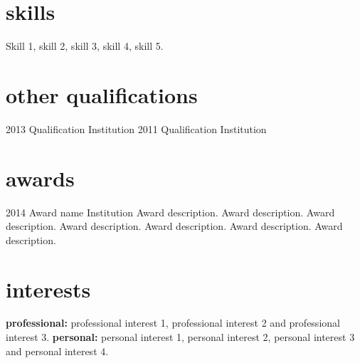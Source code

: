\documentclass[]{cv-style}          %
\begin{document}

\section{skills}
  \vspace{-0.2cm}

Skill 1, skill 2, skill 3, skill 4, skill 5.


\section{other qualifications}

\begin{entrylist}
\entry
{2013}
{Qualification}
{Institution}
{\vspace{-0.3cm}}
\entry
{2011}
{Qualification}
{Institution}
{\vspace{-0.3cm}}
\end{entrylist}


\section{awards}

\begin{entrylist}
\entry
{2014}
{Award name}
{Institution}
{Award description. Award description. Award description. Award description. Award description. Award description. Award description. }
\end{entrylist}


\section{interests}
  \vspace{-0.2cm}

\textbf{professional:} professional interest 1, professional interest 2 and professional interest 3. \textbf{personal:} personal interest 1, personal interest 2, personal interest 3 and personal interest 4.

\end{document}
